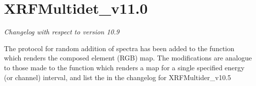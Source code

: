 \documentclass[a4paper,12pt]{article}
\begin{document}
\section{XRFMultidet\_v11.0}
\textit{Changelog with respect to version 10.9}

The protocol for random addition of spectra has been added to the function which renders the composed element (RGB) map. The modifications are analogue to those made to the function which renders a map for a single specified energy (or channel) interval, and list the in the changelog for XRFMultider\_v10.5

%
\end{document}
